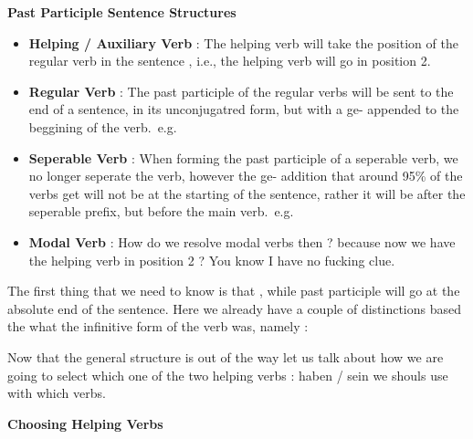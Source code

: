 \documentclass[a4paper,twocolumn,10pt]{article}
\newcommand{\newpar}
{\par \vspace{0.3cm}}
\begin{document}
\textbf{Past Participle Sentence Structures}
\newpar

\begin{itemize}[noitemsep]

	\item \textbf{Helping / Auxiliary Verb} : The helping verb will take the
position of the regular verb in the sentence , i.e., the helping verb will go in
position 2.\\

	\item \textbf{Regular Verb} : The past participle of the regular verbs will be sent
		to the end of a sentence, in its unconjugatred form, but with a ge-
		appended to the beggining of the verb.\ e.g.\   \\

	\item \textbf{Seperable Verb} : When forming the past participle of a seperable verb,
		we no longer seperate the verb, however the ge- addition that around
		95\% of the verbs get will not be at the starting of the sentence,
		rather it will be after the seperable prefix, but before the main verb.\
		e.g.\ \\

	\item \textbf{Modal Verb} : How do we resolve modal verbs then ? because now we have
		the helping verb in position 2 ? You know I have no fucking clue.\\

\end{itemize}


The first thing that we need to know is that , while past participle will go at the absolute end of the sentence.
Here we already have a couple of distinctions based the what the infinitive form
of the verb was, namely :\newpar

Now that the general structure is out of the way let us talk about how we are
going to select which one of the two helping verbs : haben / sein we shouls use
with which verbs. 


\textbf{Choosing Helping Verbs}
\end{document}
